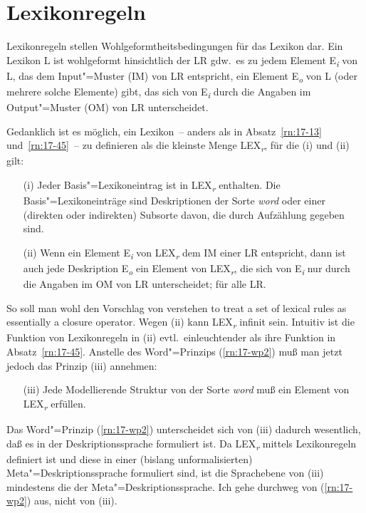 \documentclass[output=paper]{LSP/langsci}
\begin{document}
\section{Lexikonregeln}

\randnum\label{rn:17-45}Lexikonregeln stellen Wohlgeformtheitsbedingungen für das Lexikon
dar. Ein Lexikon L ist wohlgeformt hinsichtlich der  LR
gdw.\ es zu jedem Element E\textsubscript{\textit{i}} von L, das dem Input"=Muster (IM) von LR
entspricht, ein Element E\textsubscript{\textit{o}} von L (oder mehrere solche Elemente) gibt,
das sich von E\textsubscript{\textit{i}} durch die Angaben im Output"=Muster (OM) von LR
unterscheidet.

\randnum\label{rn:17-45a}Gedanklich ist es möglich, ein Lexikon~--
anders als in Absatz~\ref{rn:17-13} und~\ref{rn:17-45}~--  zu
definieren als die kleinste Menge LEX\textsubscript{\textit{r}}, für die
(i) und (ii) gilt:
\begin{enumerate}
\item[(i)]Jeder Basis"=Lexikoneintrag ist in LEX\textsubscript{\textit{r}} enthalten. Die
Basis"=Lexikoneinträge sind Deskriptionen der Sorte \textit{word} oder einer
(direkten oder indirekten) Subsorte davon, die durch Aufzählung
gegeben sind.
\item[(ii)]Wenn ein Element E\textsubscript{\textit{i}} von LEX\textsubscript{\textit{r}} dem IM einer  LR entspricht,
dann ist auch jede Deskription E\textsubscript{\textit{o}} ein Element von LEX\textsubscript{\textit{r}}, die sich von E\textsubscript{\textit{i}} nur durch die Angaben im OM von LR unterscheidet; für alle LR.
\end{enumerate}
So soll man wohl den Vorschlag von \citet[S.\,395 Anm.\ 1]{PollardSag1994} verstehen {\glqq}to
treat a set of lexical rules as essentially a closure operator{\grqq}. Wegen
(ii) kann LEX\textsubscript{\textit{r}} infinit sein. Intuitiv ist die Funktion von
Lexikonregeln in (ii) evtl.\ einleuchtender als ihre Funktion in
Absatz~\ref{rn:17-45}. Anstelle des Word"=Prinzips (\ref{rn:17-wp2}) muß man jetzt jedoch das
Prinzip (iii) annehmen:
\begin{enumerate}
\item[(iii)]Jede Modellierende Struktur von der Sorte \textit{word} muß ein Element von LEX\textsubscript{\textit{r}} erfüllen.
\end{enumerate}
Das Word"=Prinzip (\ref{rn:17-wp2}) unterscheidet sich von (iii) dadurch wesentlich,
daß es in der Deskriptionssprache formuliert ist. Da LEX\textsubscript{\textit{r}} mittels
Lexikonregeln definiert ist und diese in einer (bislang
unformalisierten) Meta"=Deskriptionssprache formuliert sind, ist die
Sprachebene von (iii) mindestens die der Meta"=Deskriptionssprache. Ich
gehe durchweg von (\ref{rn:17-wp2}) aus, nicht von (iii).
\end{document}
